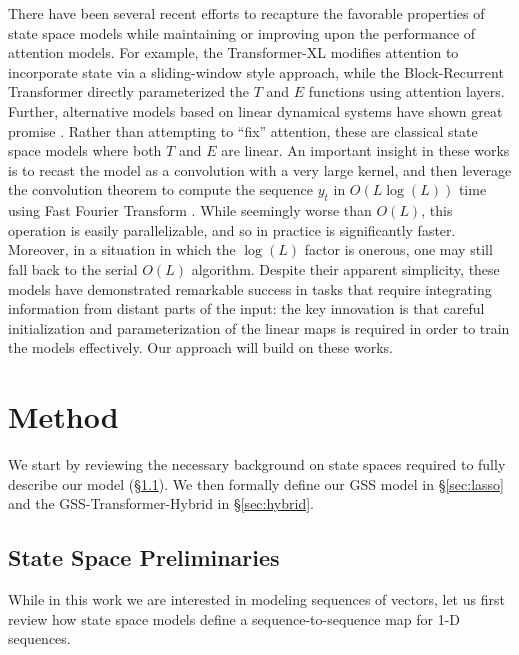 There have been several recent efforts to recapture the favorable properties of state space models while maintaining or improving upon the performance of attention models. For example, the Transformer-XL \citep{Dai2019transformerxl} modifies attention to incorporate state via a sliding-window style approach, while the Block-Recurrent Transformer \citep{hutchins2022block} directly parameterized the $T$ and $E$ functions using attention layers. Further, alternative models based on linear dynamical systems have shown great promise \citep{gu2022efficiently, dss_gupta2022diagonal,Gu2022OnTP}. Rather than attempting to ``fix'' attention, these are classical state space models where both $T$ and $E$ are linear. An important insight in these works is to recast the model as a convolution with a very large kernel, and then leverage the convolution theorem to compute the sequence $y_t$ in $O(L\log(L))$ time using Fast Fourier Transform \citep{Cooley1965AnAF}. While seemingly worse than $O(L)$, this operation is easily parallelizable, and so in practice is significantly faster. Moreover, in a situation in which the $\log(L)$ factor is onerous, one may still fall back to the serial $O(L)$ algorithm. Despite their apparent simplicity, these models have demonstrated remarkable success in tasks that require integrating information from distant parts of the input: the key innovation is that careful initialization and parameterization of the linear maps is required in order to train the models effectively. Our approach will build on these works.

\section{Method}\label{sec:ssm}

We start by reviewing the necessary background on state spaces required to fully describe our model (\S\ref{sec:state-spaces}). We then formally define our GSS model in \S\ref{sec:lasso} and the GSS-Transformer-Hybrid in \S\ref{sec:hybrid}.

\subsection{State Space Preliminaries}\label{sec:state-spaces}

While in this work we are interested in modeling sequences of vectors, let us first review how state space models define a sequence-to-sequence map for 1-D sequences.

